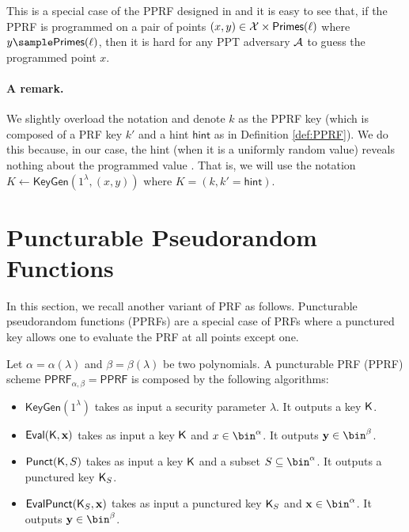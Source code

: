 This is a special case of the PPRF designed in \cite{CCS:KMPRT17} and it is easy to see that, if the PPRF is programmed on a pair of points $(x,y)\in\mathcal{X}\times \mathsf{Primes}(\ell)$ where $y\sample  \mathsf{Primes}(\ell)$, then it is hard for any PPT adversary $\mathcal{A}$ to guess the programmed point $x$.


\paragraph{A remark.} We slightly overload the notation and denote  $k$ as the PPRF key  (which is composed of a PRF key $k'$ and a hint $\mathsf{hint}$ as in Definition \ref{def:PPRF}). We do this because, in our case, the hint (when it is a uniformly random value) reveals nothing about the programmed value \cite{CCS:KMPRT17}. That is, we will use the notation $K\leftarrow\mathsf{KeyGen}(1^\lambda,(x,y))$ where $K=(k,k'=\mathsf{hint})$.

\section{Puncturable Pseudorandom Functions}
In this section,  we recall another variant of PRF as follows.
Puncturable pseudorandom functions (PPRFs) \cite{AC:BonWat13,CCS:KPTZ13,PKC:BoyGolIva14} are a special case of PRFs where a punctured key allows one to evaluate the PRF at all points except one. 

\begin{definition}
Let $\alpha=\alpha(\lambda)$ and $\beta=\beta(\lambda)$ be two polynomials. A puncturable PRF (PPRF) scheme $\mathsf{PPRF}_{\alpha,\beta}=\mathsf{PPRF}$ is composed by the following algorithms:
\begin{itemize}
\item $\mathsf{KeyGen}(1^\lambda)$ takes as input a security parameter $\lambda$. It outputs a key $\mathsf{K}$.
    \item $\mathsf{Eval}(\mathsf{K},\mathbf{x})$ takes as input a key $\mathsf{K}$ and $x\in\bin^\alpha$. It outputs $\yn\in\bin^\beta$.
    \item $\mathsf{Punct}(\mathsf{K},S)$ takes as input a key $\mathsf{K}$ and a subset $S\subseteq\bin^\alpha$. It outputs a punctured key $\mathsf{K}_S$.
    \item $\mathsf{EvalPunct}(\mathsf{K}_S,\mathbf{x})$ takes as input a punctured key $\mathsf{K}_S$ and $\xn\in\bin^\alpha$. It outputs $\yn\in\bin^\beta$.
\end{itemize}
\end{definition}


